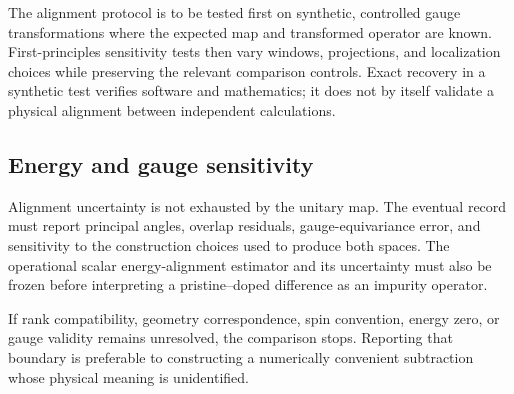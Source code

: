 The alignment protocol is to be tested first on synthetic, controlled gauge
transformations where the expected map and transformed operator are known.
First-principles sensitivity tests then vary windows, projections, and
localization choices while preserving the relevant comparison controls. Exact
recovery in a synthetic test verifies software and mathematics; it does not by
itself validate a physical alignment between independent calculations.

\subsection{Energy and gauge sensitivity}


Alignment uncertainty is not exhausted by the unitary map. The eventual record
must report principal angles, overlap residuals, gauge-equivariance error, and
sensitivity to the construction choices used to produce both spaces. The
operational scalar energy-alignment estimator and its uncertainty must also be
frozen before interpreting a pristine--doped difference as an impurity
operator.

If rank compatibility, geometry correspondence, spin convention, energy zero,
or gauge validity remains unresolved, the comparison stops. Reporting that
boundary is preferable to constructing a numerically convenient subtraction
whose physical meaning is unidentified.
